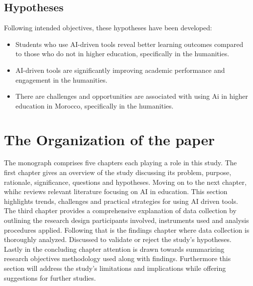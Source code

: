 \subsection{Hypotheses}\label{subsec:hypotheses}
\justifying
\noindent
Following intended objectives, these hypotheses have been developed:
\begin{itemize}
      \item Students who use AI-driven tools reveal better learning outcomes
            compared to those who do not in higher education, specifically in the humanities.
      \item AI-driven tools are significantly improving academic
            performance and engagement in the humanities.
      \item There are challenges and opportunities are associated with using Ai in higher
            education in Morocco, specifically in the humanities.
\end{itemize}



\section{The Organization of the paper}\label{sec:the-organization-of-the-paper}
\justifying
The monograph comprises five chapters each playing a role in this study. 
The first chapter gives an overview of the study discussing its problem, purpose, rationale, significance, questions and hypotheses. 
Moving on to the next chapter, whihc reviews relevant literature focusing on AI in education. 
This section highlights trends, challenges and practical strategies for using AI driven tools. 
The third chapter provides a comprehensive explanation of data collection by outlining the research 
design participants involved, instruments used and analysis procedures applied. Following that is the 
findings chapter where data collection is thoroughly analyzed. Discussed to validate or reject the study's hypotheses. 
Lastly in the concluding chapter attention is drawn towards summarizing research objectives methodology used along with findings. 
Furthermore this section will address the study's limitations and implications while offering suggestions for further studies. 






